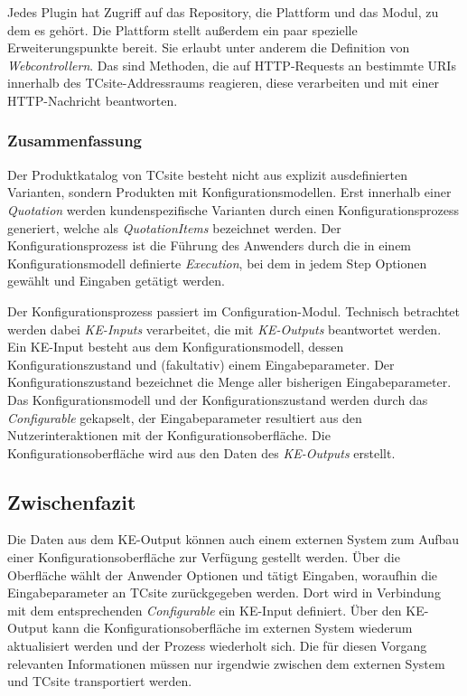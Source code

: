 \documentclass[11pt, a4paper, titlepage, listof=totoc, bibliography=totoc, index=totoc, twoside, openright, headings=normal]{scrreprt}
\begin{document}
Jedes Plugin hat Zugriff auf das Repository, die Plattform und das Modul, zu dem es gehört. Die Plattform stellt außerdem ein paar spezielle Erweiterungspunkte bereit. Sie erlaubt unter anderem die Definition von \emph{Webcontrollern}. Das sind Methoden, die auf HTTP-Requests an bestimmte URIs innerhalb des TCsite-Addressraums reagieren, diese verarbeiten und mit einer HTTP-Nachricht beantworten.

\subsubsection*{Zusammenfassung}
Der Produktkatalog von TCsite besteht nicht aus explizit ausdefinierten Varianten, sondern Produkten mit Konfigurationsmodellen. Erst innerhalb einer \emph{Quotation} werden kundenspezifische Varianten durch einen Konfigurationsprozess generiert, welche als \emph{QuotationItems} bezeichnet werden. Der Konfigurationsprozess ist die Führung des Anwenders durch die in einem Konfigurationsmodell definierte \emph{Execution}, bei dem in jedem Step Optionen gewählt und Eingaben getätigt werden.

Der Konfigurationsprozess passiert im Configuration-Modul. Technisch betrachtet werden dabei \emph{KE-Inputs} verarbeitet, die mit \emph{KE-Outputs} beantwortet werden. Ein KE-Input besteht aus dem Konfigurationsmodell, dessen Konfigurationszustand und (fakultativ) einem Eingabeparameter. Der Konfigurationszustand bezeichnet die Menge aller bisherigen Eingabeparameter. Das Konfigurationsmodell und der Konfigurationszustand werden durch das \emph{Configurable} gekapselt, der Eingabeparameter resultiert aus den Nutzerinteraktionen mit der Konfigurationsoberfläche. Die Konfigurationsoberfläche wird aus den Daten des \emph{KE-Outputs} erstellt.

\subsection{Zwischenfazit}
\label{TCsiteFazit}

Die Daten aus dem KE-Output können auch einem externen System zum Aufbau einer Konfigurationsoberfläche zur Verfügung gestellt werden. Über die Oberfläche wählt der Anwender Optionen und tätigt Eingaben, woraufhin die Eingabeparameter an TCsite zurückgegeben werden. Dort wird in Verbindung mit dem entsprechenden \emph{Configurable} ein KE-Input definiert. Über den KE-Output kann die Konfigurationsoberfläche im externen System wiederum aktualisiert werden und der Prozess wiederholt sich. Die für diesen Vorgang relevanten Informationen müssen nur irgendwie zwischen dem externen System und TCsite transportiert werden.
\end{document}
